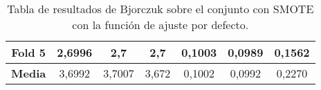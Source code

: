 \begin{table}[H]
{\begin{tabular}{|ccccccc|}
\multicolumn{1}{|c|}{\textbf{Fold 5}} & \multicolumn{1}{c|}{2,6996}            & \multicolumn{1}{c|}{2,7}                 & \multicolumn{1}{c|}{\textbf{2,7}}  & \multicolumn{1}{c|}{0,1003}            & \multicolumn{1}{c|}{0,0989}              & 0,1562          \\ \hline
\multicolumn{1}{|c|}{\textbf{Media}}  & \multicolumn{1}{c|}{3,6992}           & \multicolumn{1}{c|}{3,7007}             & \multicolumn{1}{c|}{3,672}         & \multicolumn{1}{c|}{0,1002}           & \multicolumn{1}{c|}{0,0992}             & 0,2270         \\ \hline
\end{tabular}%
}
\caption{Tabla de resultados de Bjorczuk sobre el conjunto con SMOTE con la función de ajuste por defecto.}\label{tablaBJORCZUKconSMOTEdefecto}
\end{table}



